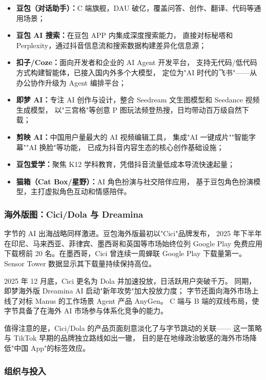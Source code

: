 \begin{itemize}
  \item \textbf{豆包（对话助手）：}C 端旗舰，DAU 破亿，覆盖问答、创作、翻译、代码等通用场景；
  \item \textbf{豆包 AI 搜索：}在豆包 APP 内集成深度搜索能力，
    直接对标秘塔和 Perplexity，通过抖音信息流和搜索数据构建差异化信息源；
  \item \textbf{扣子/Coze：}面向开发者和企业的 AI Agent 开发平台，
    支持无代码/低代码方式构建智能体，已接入国内外多个大模型，
    定位为"AI 时代的飞书"——从办公协作升级为 Agent 编排平台；
  \item \textbf{即梦 AI：}专注 AI 创作与设计，整合 Seedream 文生图模型和 Seedance 视频生成模型，
    以"三宫格"等创意 P 图玩法频登热搜，日均带动百万级自然下载；
  \item \textbf{剪映 AI：}中国用户量最大的 AI 视频编辑工具，
    集成"AI 一键成片""智能字幕""AI 换脸"等功能，
    已成为抖音内容生态的核心创作基础设施；
  \item \textbf{豆包爱学：}聚焦 K12 学科教育，凭借抖音流量低成本导流快速起量；
  \item \textbf{猫箱（Cat Box/星野）：}AI 角色扮演与社交陪伴应用，
    基于豆包角色扮演模型，主打虚拟角色互动和情感陪伴。
\end{itemize}

\subsubsection{海外版图：Cici/Dola 与 Dreamina}

字节的 AI 出海战略同样激进。豆包海外版最初以"Cici"品牌发布，
2025 年下半年在印尼、马来西亚、菲律宾、墨西哥和英国等市场始终位列
Google Play 免费应用下载榜前 20 名。在墨西哥，Cici 曾连续一周蝉联
Google Play 下载量第一。Sensor Tower 数据显示其下载量持续保持高位。

2025 年 12 月底，Cici 更名为 Dola 并加速投放，日活跃用户突破千万。
同期，即梦海外版 Dreamina AI 启动"新年攻势"加大投放力度；
字节还面向海外市场上线了对标 Manus 的工作场景 Agent 产品 AnyGen。
C 端与 B 端的双线布局，使字节具备了在海外 AI 市场参与体系化竞争的能力。

值得注意的是，Cici/Dola 的产品页面刻意淡化了与字节跳动的关联——
这一策略与 TikTok 早期的品牌独立路线如出一辙，
目的是在地缘政治敏感的海外市场降低"中国 App"的标签效应。

\subsubsection{组织与投入}

